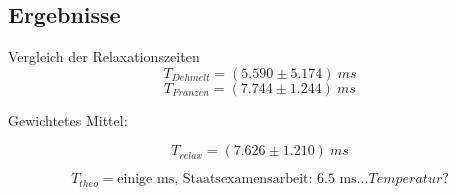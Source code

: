\documentclass{beamer}
\begin{document}
\subsection{Ergebnisse}
\begin{frame}{Vergleich der Relaxationszeiten}
$$T_{Dehmelt} = (5.590 \pm 5.174)\ ms$$
$$T_{Franzen} = (7.744 \pm 1.244)\ ms$$

Gewichtetes Mittel:

$$\boxed{T_{relax} = (7.626 \pm 1.210)\ ms} $$

\pause $$T_{theo} = \text{einige ms, \ \ \ Staatsexamensarbeit: 6.5 ms} \dots Temperatur?$$

\end{frame}


\begin{frame}[plain]
\begin{center}
\end{center}
\end{frame}
\end{document}
